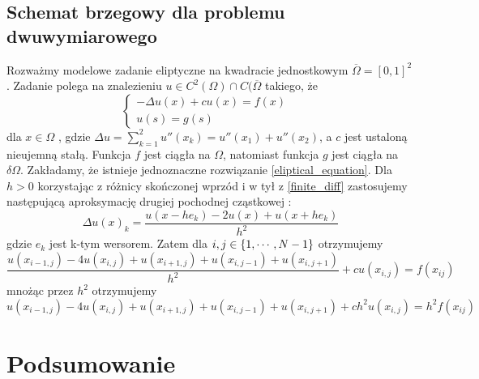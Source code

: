 \documentclass[12pt,a4paper]{report}
\begin{document}
\section{Schemat brzegowy dla problemu dwuwymiarowego}
Rozważmy modelowe zadanie eliptyczne na kwadracie jednostkowym $ \overline{\Omega} = [0,1]^2 $. Zadanie polega na znalezieniu $ u \in C^2(\Omega) \cap C(\overline{\Omega} $ takiego, że
\begin{equation} \label{eliptical_equation}
\left\{ \begin{array}{ll}
-\Delta u(x) + cu(x) = f(x) & \\
u(s) = g(s) &
\end{array} \right.
\end{equation}
dla $ x \in \Omega $ , gdzie $\Delta u = \sum_{k=1}^{2} u''(x_k) = u''(x_1) + u''(x_2)$, a $c$ jest ustaloną nieujemną stałą. Funkcja $f$ jest ciągła na $\Omega$, natomiast funkcja $g$ jest ciągła na $\delta \Omega$. Zakładamy, że istnieje jednoznaczne rozwiązanie \ref{eliptical_equation}. Dla $h>0$ korzystając z różnicy skończonej wprzód i w tył z \ref{finite_diff} zastosujemy następującą aproksymację drugiej pochodnej cząstkowej :
\begin{equation}
\Delta u(x)_k= \frac{u(x-he_{k}) - 2u(x) + u(x+he_k)}{h^2}
\end{equation}
gdzie $e_k$ jest k-tym wersorem. Zatem dla $ i,j \in \left\lbrace {1,\cdots,N-1} \right\rbrace $ otrzymujemy 
$$
\frac{u(x_{i-1,j}) - 4u(x_{i,j}) + u(x_{i+1,j})+u(x_{i,j-1})+u(x_{i,j+1})}{h^2} + cu(x_{i,j}) = f(x_{ij})
$$
mnożąc przez $h^2$ otrzymujemy 
\begin{equation}
u(x_{i-1,j}) - 4u(x_{i,j}) + u(x_{i+1,j})+u(x_{i,j-1})+u(x_{i,j+1}) + ch^2u(x_{i,j}) = h^2f(x_{ij})
\end{equation}
\chapter{Podsumowanie}
\begin{example}[Przykład] \label{example-otwarty-euler}
\end{example}



\end{document}
